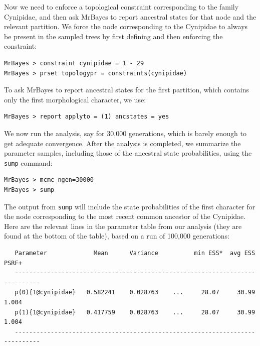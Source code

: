 \documentclass[12pt]{book}
\newcommand{\ttt}[1]{\texttt{#1} }
\begin{document}
Now we need to enforce a topological constraint corresponding to the family Cynipidae, and then ask MrBayes to
report ancestral states for that node and the relevant partition. We force the node corresponding to the Cynipidae
to always be present in the sampled trees by first defining and then enforcing the constraint:

\begin{singlespacing}
\begin{verbatim}
MrBayes > constraint cynipidae = 1 - 29
MrBayes > prset topologypr = constraints(cynipidae)
\end{verbatim}
\end{singlespacing}

To ask MrBayes to report ancestral states for the first partition, which contains only the first morphological character,
we use:

\begin{verbatim}
MrBayes > report applyto = (1) ancstates = yes
\end{verbatim}

We now run the analysis, say for 30,000 generations, which is barely enough to get adequate convergence.
After the analysis is completed, we summarize the parameter samples, including those of the ancestral state
probabilities, using the \ttt{sump} command:

\begin{singlespacing}
\begin{verbatim}
MrBayes > mcmc ngen=30000
MrBayes > sump
\end{verbatim}
\end{singlespacing}

The output from \ttt{sump} will include the state probabilities of the first character for the node corresponding to
the most recent common ancestor of the Cynipidae. Here are the relevant lines in the parameter table from
our analysis (they are found at the bottom of the table), based on a run of 100,000 generations:

\footnotesize
\begin{singlespacing}
\begin{verbatim}
   Parameter             Mean      Variance          min ESS*  avg ESS    PSRF+ 
   -----------------------------------------------------------------------------
   p(0){1@cynipidae}   0.582241    0.028763    ...     28.07     30.99    1.004
   p(1){1@cynipidae}   0.417759    0.028763    ...     28.07     30.99    1.004
   -----------------------------------------------------------------------------
\end{verbatim}
\end{singlespacing}
\normalsize
\end{document}
